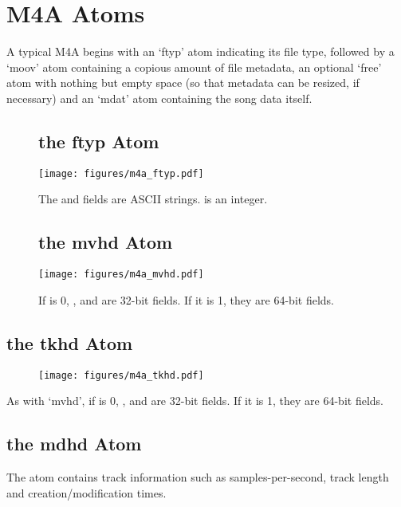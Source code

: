 \section{M4A Atoms}
A typical M4A begins with an `ftyp' atom indicating its file type,
followed by a `moov' atom containing a copious amount of file metadata,
an optional `free' atom with nothing but empty space
(so that metadata can be resized, if necessary) and an `mdat' atom
containing the song data itself.
\begin{figure}[h]
\subsection{the ftyp Atom}
\texttt{[image: figures/m4a\_ftyp.pdf]}
\par
The  and  fields are ASCII strings.
 is an integer.

\subsection{the mvhd Atom}
\texttt{[image: figures/m4a\_mvhd.pdf]}
\par
If  is 0, ,  and
 are 32-bit fields.  If it is 1, they are 64-bit fields.
\end{figure}

\pagebreak

\subsection{the tkhd Atom}
\par
\begin{figure}[h]
\texttt{[image: figures/m4a\_tkhd.pdf]}
\end{figure}
\par
\noindent
As with `mvhd', if  is 0, ,
 and  are 32-bit fields.
If it is 1, they are 64-bit fields.

\subsection{the mdhd Atom}

The  atom contains track information such as samples-per-second,
track length and creation/modification times.

